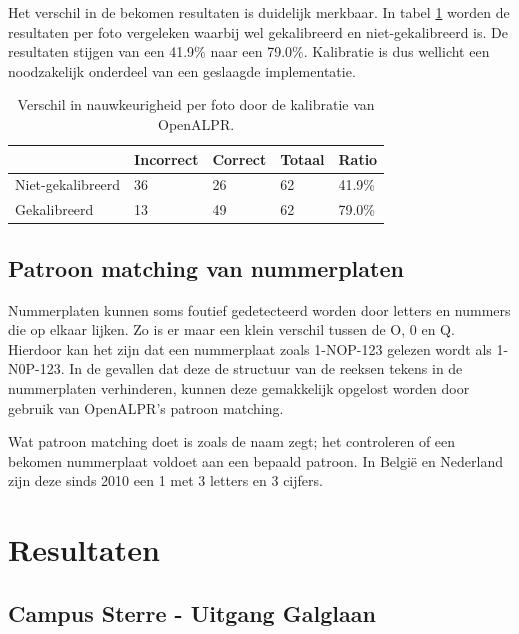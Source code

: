 Het verschil in de bekomen resultaten is duidelijk merkbaar. In tabel \ref{tab:kalibratiealpr} worden de resultaten per foto vergeleken waarbij wel gekalibreerd en niet-gekalibreerd is. De resultaten stijgen van een 41.9\% naar een 79.0\%. Kalibratie is dus wellicht een noodzakelijk onderdeel van een geslaagde implementatie.
\begin{table}[h!]
	\centering
	\begin{tabular}{l|l|l|l|l}
		 		& Incorrect & Correct & Totaal & Ratio	\\ \hline
		Niet-gekalibreerd	& 36 & 26 & 62 & 41.9\%	\\
		Gekalibreerd	& 13 & 49 & 62 & 79.0\%\\
	\end{tabular}
\caption{Verschil in nauwkeurigheid per foto door de kalibratie van OpenALPR.}
\label{tab:kalibratiealpr}
\end{table}

\subsection{Patroon matching van nummerplaten}
Nummerplaten kunnen soms foutief gedetecteerd worden door letters en nummers die op elkaar lijken. Zo is er maar een klein verschil tussen de O, 0 en Q. 
Hierdoor kan het zijn dat een nummerplaat zoals 1-NOP-123 gelezen wordt als 1-N0P-123. In de gevallen dat deze de structuur van de reeksen tekens in de nummerplaten verhinderen, kunnen deze gemakkelijk opgelost worden door gebruik van OpenALPR's patroon matching.

Wat patroon matching doet is zoals de naam zegt; het controleren of een bekomen nummerplaat voldoet aan een bepaald patroon. In België en Nederland zijn deze sinds 2010 een 1 met 3 letters en 3 cijfers.

\section{Resultaten}

\subsection{Campus Sterre - Uitgang Galglaan}


